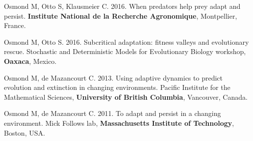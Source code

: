\documentclass[12pt]{article}
\begin{document}
Osmond M, Otto S, Klausmeier C. 2016. When predators help prey adapt and persist. \textbf{Institute National de la Recherche Agronomique}, Montpellier, France. 

Osmond M, Otto S. 2016. Subcritical adaptation: fitness valleys and evolutionary rescue. Stochastic and Deterministic Models for Evolutionary Biology workshop, \textbf{Oaxaca}, Mexico. 


Osmond M, de Mazancourt C. 2013. Using adaptive dynamics to predict evolution and extinction in changing environments. Pacific Institute for the Mathematical Sciences, \textbf{University of British Columbia}, Vancouver, Canada.


Osmond M, de Mazancourt C. 2011. To adapt and persist in a changing environment. Mick Follows lab, \textbf{Massachusetts Institute of Technology}, Boston, USA.
\end{document}
